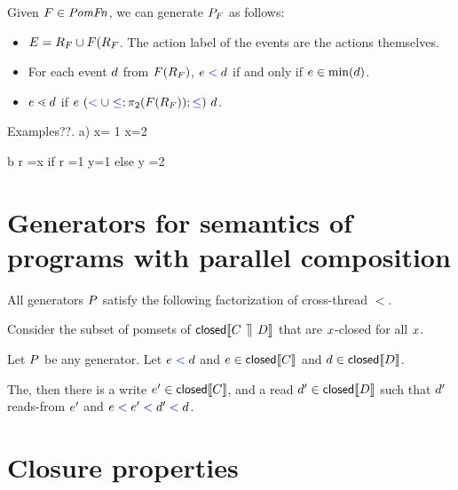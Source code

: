 \begin{definition}
Given $F \in \mathit{PomFn}$, we can generate $P_{F}$ as follows:
\begin{itemize}
\item $E = R_{F} \cup F(R_{F}$.  The action label of the events are the actions themselves.  
\item For each event $d$ from $F(R_{F})$, $e \mathrel{{\color{blue}<}} d$ if and only if $e \in \min(d)$.
\item $e \lessdot d$ if $ e\ (\mathrel{{\color{blue}<}} \cup \mathrel{{\color{blue}\leq}};\pi_2(F(R_{F})); \mathrel{{\color{blue}\leq}}) \  d$.
\end{itemize}
\end{definition}

Examples??.  
a) x= 1
x=2

b  r =x
   if r =1  {y=1}
   else      {y =2}

\section{Generators for semantics of programs with parallel composition}
All generators $P$  satisfy the following factorization of cross-thread $\lt$.  

\begin{lemma}\label{pargen}
Consider the subset of pomsets of $\textsf{closed}\llbracket C \,\mathbin{\rrceil}\, D\rrbracket$ that are  $x$-closed for all $x$.  

Let $P$  be any generator.  Let $e\mathrel{{\color{blue}<}}d$ and $e \in \textsf{closed}\llbracket C\rrbracket$ and  $d \in \textsf{closed}\llbracket D\rrbracket $.  

The,  then there is a write  $e' \in \textsf{closed}\llbracket C\rrbracket$, and  a read $d' \in \textsf{closed}\llbracket D\rrbracket$ such that  $d'$ reads-from $e'$ and $e \mathrel{{\color{blue}<}} e' \mathrel{{\color{blue}<}} d' \mathrel{{\color{blue}<}} d$. 



\end{lemma}

\section{Closure properties}

